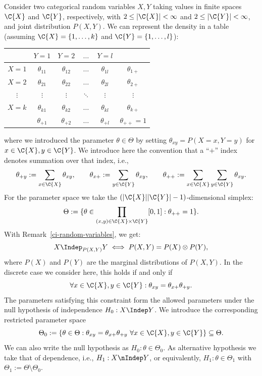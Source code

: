 Consider two categorical random variables $X,Y$ taking values in finite spaces $\C{X}$ and $\C{Y}$,
respectively, with $2 \le |\C{X}| < \infty$ and $2 \le |\C{Y}| < \infty$, and joint distribution $P(X,Y)$.
We can represent the density in a table (assuming $\C{X} = \{1,\dots,k\}$ and $\C{Y} = \{1,\dots,l\}$):
\begin{center}\begin{tabular}{c|cccc|c}
  & $Y=1$         & $Y=2$ & $\dots$ & $Y=l$ \\
  \hline
  $X=1$ & $\theta_{11}$      & $\theta_{12}$      & $\dots$ & $\theta_{1l}$ & $\theta_{1+}$\\
  $X=2$ & $\theta_{21}$      & $\theta_{22}$      & $\dots$ & $\theta_{2l}$ & $\theta_{2+}$\\
  $\vdots$ & $\vdots$     & $\vdots$       & $\ddots$ & $\vdots$  & $\vdots$ \\
  $X=k$ & $\theta_{k1}$      & $\theta_{k2}$      & $\dots$ & $\theta_{kl}$ & $\theta_{k+}$ \\
  \hline
  & $\theta_{+ 1}$ & $\theta_{+ 2}$ & $\dots$ & $\theta_{+ l}$ & $\theta_{++}=1$\\
\end{tabular}\end{center}
where we introduced the parameter $\theta \in \Theta$ by setting $\theta_{xy} = P(X=x,Y=y)$ for
$x \in \C{X}, y \in \C{Y}$.
We introduce here the convention that a ``$+$'' index denotes summation over that index, i.e.,
$$\theta_{+ y} := \sum_{x\in\C{X}} \theta_{xy}, \qquad \theta_{x+} := \sum_{y\in\C{Y}} \theta_{xy}, \qquad \theta_{++} := \sum_{x\in\C{X}}\sum_{y\in\C{Y}} \theta_{xy}.$$
For the parameter space we take the $(|\C{X}||\C{Y}|-1)$-dimensional simplex:
$$\Theta := \{ \theta \in \prod_{(x,y)\in\C{X}\times\C{Y}} [0,1] : \theta_{+ +} = 1 \}.$$
With Remark~\ref{ci-random-variables}, we get:
$$X \Indep_{P(X,Y)} Y \iff P(X,Y) = P(X) \otimes P(Y),$$
where $P(X)$ and $P(Y)$ are the marginal distributions of $P(X,Y)$.
In the discrete case we consider here, this holds if and only if
$$\forall x \in \C{X}, y \in \C{Y}: \theta_{xy} = \theta_{x+} \theta_{+ y}.$$
The parameters satisfying this constraint form the allowed parameters under the
null hypothesis of independence $H_0 : X \Indep Y$.
We introduce the corresponding restricted parameter space
$$\Theta_0 := \{\theta \in \Theta : \theta_{xy} = \theta_{x+} \theta_{+ y} \ \forall x\in\C{X},y\in\C{Y} \} \subseteq \Theta.$$
We can also write the null hypothesis as $H_0 : \theta \in \Theta_0$.
As alternative hypothesis we take that of dependence, i.e., $H_1 : X \nIndep Y$, or equivalently,
$H_1 : \theta \in \Theta_1$ with $\Theta_1 := \Theta \setminus \Theta_0$.

